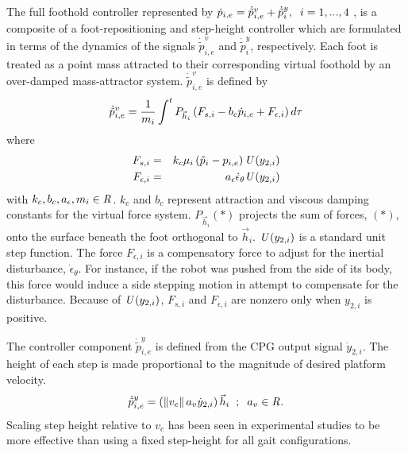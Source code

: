 %
		The full foothold controller represented by $\dot{p}_{i,e} = \dot{\tilde{p}}_{i,e}^{v} + \dot{\tilde{p}}_{i}^{y}, \hspace{2mm} i = 1,...,4$ , is a composite of a foot-repositioning and step-height controller which are formulated in terms of the dynamics of the signals $\dot{\tilde{p}}_{i,e}^{v}$ and $\dot{\tilde{p}}_{i}^{y}$, respectively. Each foot is treated as a point mass attracted to their corresponding virtual foothold by an over-damped mass-attractor system. $\dot{\tilde{p}}_{i,e}^{v}$ is defined by
			\begin{equation}
				\label{eq::FootControl}
				\dot{\tilde{p}}_{i,e}^{v} 		= \frac{1}{m_{i}} \int^t{{P}_{\vec{h}_{i}} \left( F_{s,i}  -b_{c} \dot{p}_{i,e} + F_{\epsilon,i} \right) d\tau}
			\end{equation}
		where
			\begin{eqnarray*}
				F_{s,i} 			& = & k_{c}  \mu_{i} \left( \tilde{p}_{i} - {p}_{i,e} \right) \emph{U}\left(y_{2,i}\right)		\nonumber\\
				F_{\epsilon,i}		& = & a_{\epsilon}\dot{\epsilon}_{\theta} \emph{U}\left(y_{2,i}\right)						\nonumber
			\end{eqnarray*}
	 	with $k_{c},b_{c},a_{\epsilon},m_{i} \in\emph{R}^{}$.
		$k_{c}$ and $b_{c}$ represent  attraction and viscous damping constants for the virtual force system. ${P}_{\vec{h}_{i}}(*)$ projects the sum of  forces, $(*)$, onto the surface beneath the \Ith foot orthogonal to $\vec{h}_{i}$. $\emph{U}\left(y_{2,i}\right)$ is a standard unit step function. The force $F_{\epsilon,i}$ is a compensatory force to adjust for the inertial disturbance,  $\dot{\epsilon}_{\theta}$. For instance, if the robot was pushed from the side of its body, this force would induce a side stepping motion in attempt to compensate for the disturbance. Because of $\emph{U}\left(y_{2,i}\right)$, $F_{s,i}$ and $F_{\epsilon,i}$ are nonzero only when $y_{2,i}$ is positive.

		The controller component $\dot{\tilde{p}}_{i,e}^{y}$ is defined from the CPG output signal $\dot{y}_{2,i}$. The height of each step is made proportional to the magnitude of desired platform velocity.
		\begin{equation}
			\dot{\tilde{p}}_{i,e}^{y} 	= \left( \left\lVert v_{c}\right\rVert a_{v} \dot{y}_{2,i}\right) \vec{h}_{i} 	\hspace{2mm} ; \hspace{2mm} a_{v}  \in\emph{R}^{}.
			\label{eq::FootControl}
		\end{equation}
		Scaling step height relative to $v_c$ has been seen in experimental studies to be more effective than using a fixed step-height for all gait configurations. %




